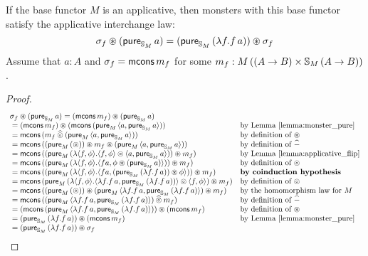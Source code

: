 \begin{lemma}
If the base functor $M$ is an applicative, then monsters with this base functor satisfy the applicative interchange law:
$$
\sigma_f \circledast (\mathsf{pure}_{\mathbb{S}_{M}}\,a) = (\mathsf{pure}_{\mathbb{S}_{M}}\,(\lambda f. f\,a)) \circledast \sigma_f
$$
Assume that $a:A$ and $\sigma_f = \mathsf{mcons}\,m_f$ for some $m_f:M\,((A\rightarrow B)\times \mathbb{S}_{M}\,(A\rightarrow B))$.
\end{lemma}
\begin{proof}
$$
\begin{array}{ll}
\sigma_f \circledast (\mathsf{pure}_{\mathbb{S}_{M}}\,a) = (\mathsf{mcons}\,m_f) \circledast (\mathsf{pure}_{\mathbb{S}_{M}}\,a) \\
{}= (\mathsf{mcons}\,m_f) \circledast (\mathsf{mcons}\,(\mathsf{pure}_M\,\langle a, \mathsf{pure}_{\mathbb{S}_{M}}\,a\rangle))
  & \mbox{by Lemma \ref{lemma:monster_pure}}\\
{}= \mathsf{mcons}\,(m_f \mathbin{\widehat{\circledcirc}} (\mathsf{pure}_M\,\langle a, \mathsf{pure}_{\mathbb{S}_{M}}\,a\rangle))
  & \mbox{by definition of }\circledast\\
{}= \mathsf{mcons}\,((\mathsf{pure}_M\,(\circledcirc)) \circledast m_f \circledast (\mathsf{pure}_M\,\langle a, \mathsf{pure}_{\mathbb{S}_{M}}\,a\rangle))
  & \mbox{by definition of }\mathbin{\widehat{-}}\\
{}= \mathsf{mcons} \, ((\mathsf{pure}_M\,(\lambda \langle f, \phi \rangle . \langle f, \phi \rangle \circledcirc \langle a, \mathsf{pure}_{\mathbb{S}_{M}}\,a \rangle)) \circledast m_f)
  & \mbox{by Lemma \ref{lemma:applicative_flip}}\\
{}= \mathsf{mcons}\,((\mathsf{pure}_M\,(\lambda \langle f, \phi \rangle . \langle f a, \phi \circledast (\mathsf{pure}_{\mathbb{S}_{M}}\,a) \rangle)) \circledast m_f)
  & \mbox{by definition of } \circledcirc \\
{}= \mathsf{mcons}\,((\mathsf{pure}_M\,(\lambda \langle f, \phi \rangle . \langle f a, (\mathsf{pure}_{\mathbb{S}_{M}}\,(\lambda f . f\, a)) \circledast \phi \rangle)) \circledast m_f)
  & \mbox{\bf by coinduction hypothesis} \\
{}= \mathsf{mcons}\,(\mathsf{pure}_M\,(\lambda \langle f, \phi \rangle.
    \langle \lambda f . f\, a, \mathsf{pure}_{\mathbb{S}_{M}}\,(\lambda f . f\, a)) \rangle
    \circledcirc \langle f, \phi \rangle
    ) \circledast m_f)
  & \mbox{by definition of } \circledcirc \\
{}= \mathsf{mcons}\,((\mathsf{pure}_M\,(\circledcirc)) \circledast (\mathsf{pure}_M\,\langle \lambda f. f\,a, \mathsf{pure}_{\mathbb{S}_{M}}\,(\lambda f. f\,a)  \rangle) \circledast m_f)
  & \mbox{by the homomorphism law for }M \\
{}= \mathsf{mcons}\,((\mathsf{pure}_M\,\langle \lambda f. f\,a, \mathsf{pure}_{\mathbb{S}_{M}}\,(\lambda f. f\,a)  \rangle) \mathbin{\widehat{\circledcirc}} m_f)
  & \mbox{by definition of }\mathbin{\widehat{-}}\\
{}= (\mathsf{mcons}\,(\mathsf{pure}_M\,\langle \lambda f. f\,a, \mathsf{pure}_{\mathbb{S}_{M}}\,(\lambda f. f\,a)  \rangle)) \circledast (\mathsf{mcons}\,m_f)
  & \mbox{by definition of }\circledast \\
{}= (\mathsf{pure}_{\mathbb{S}_{M}}\,(\lambda f. f\,a)) \circledast (\mathsf{mcons}\,m_f)
  & \mbox{by Lemma \ref{lemma:monster_pure}} \\
{} = (\mathsf{pure}_{\mathbb{S}_{M}}\,(\lambda f. f\,a)) \circledast \sigma_f
\end{array}
$$
\end{proof}


